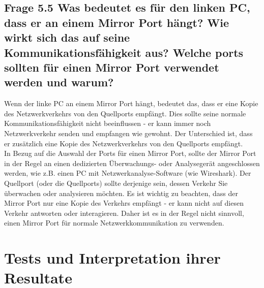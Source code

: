 \documentclass{article}
\begin{document}
\subsection*{Frage 5.5 \normalfont Was bedeutet es für den linken PC, dass er an einem Mirror Port hängt? Wie wirkt sich das auf seine Kommunikationsfähigkeit aus? Welche ports sollten für einen Mirror Port verwendet werden und warum?}
Wenn der linke PC an einem Mirror Port hängt, bedeutet das, dass er eine Kopie des Netzwerkverkehrs von den Quellports empfängt. Dies sollte seine normale Kommunikationsfähigkeit nicht beeinflussen - er kann immer noch Netzwerkverkehr senden und empfangen wie gewohnt. Der Unterschied ist, dass er zusätzlich eine Kopie des Netzwerkverkehrs von den Quellports empfängt.\\

\noindent In Bezug auf die Auswahl der Ports für einen Mirror Port, sollte der Mirror Port in der Regel an einen dedizierten Überwachungs- oder Analysegerät angeschlossen werden, wie z.B. einen PC mit Netzwerkanalyse-Software (wie Wireshark). Der Quellport (oder die Quellports) sollte derjenige sein, dessen Verkehr Sie überwachen oder analysieren möchten. Es ist wichtig zu beachten, dass der Mirror Port nur eine Kopie des Verkehrs empfängt - er kann nicht auf diesen Verkehr antworten oder interagieren. Daher ist es in der Regel nicht sinnvoll, einen Mirror Port für normale Netzwerkkommunikation zu verwenden.\\

\pagebreak
\section{Tests und Interpretation ihrer Resultate}
\end{document}
